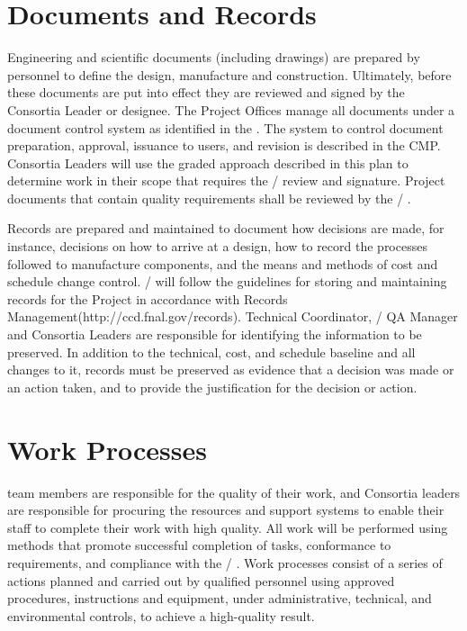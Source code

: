 \section{Documents and Records}

Engineering and scientific documents (including drawings) are prepared
by  personnel to define the design, manufacture and
construction. Ultimately, before these documents are put into effect
they are reviewed and signed by the  Consortia Leader or
designee. The  Project Offices manage all documents under
a document control system as identified in the 
.  The system to control document preparation, approval,
issuance to users, and revision is described in the CMP. Consortia
Leaders will use the graded approach described in this plan to
determine work in their scope that requires the
/  review and signature. Project
documents that contain quality requirements shall be reviewed by the
/ .

Records are prepared and maintained to document how decisions are
made, for instance, decisions on how to arrive at a design, how to
record the processes followed to manufacture components, and the means
and methods of cost and schedule change control. / will follow
the guidelines for storing and maintaining records for the Project in
accordance with \fnal Records
Management(http://ccd.fnal.gov/records).  Technical Coordinator,
/ QA Manager and Consortia Leaders are responsible for
identifying the information to be preserved. In addition to the
technical, cost, and schedule baseline and all changes to it, records
must be preserved as evidence that a decision was made or an action
taken, and to provide the justification for the decision or action.

\section{Work Processes}

 team members are responsible for the quality of their work, and
Consortia leaders are responsible for procuring the resources and
support systems to enable their staff to complete their work with high
quality. All  work will be performed using methods that promote
successful completion of tasks, conformance to  requirements, and
compliance with the / . Work processes
consist of a series of actions planned and carried out by qualified
personnel using approved procedures, instructions and equipment, under
administrative, technical, and environmental controls, to achieve a
high-quality result.


